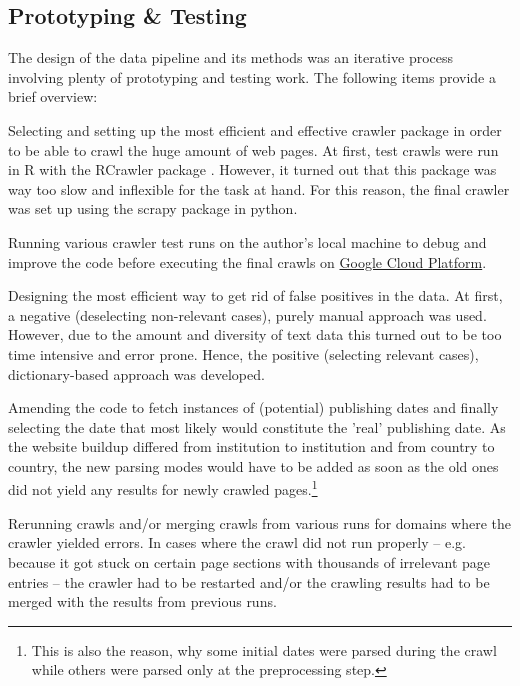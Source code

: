 \subsection{Prototyping \& Testing}\label{Prototyping and Testing}
The design of the data pipeline and its methods was an iterative process involving plenty of prototyping and testing work. The following items provide a brief overview:
\begin{compactitem}
\item Selecting and setting up the most efficient and effective crawler package in order to be able to crawl the huge amount of web pages. At first, test crawls were run in R with the RCrawler package \parencite{Khalil2017}. However, it turned out that this package was way too slow and inflexible for the task at hand. For this reason, the final crawler was set up using the scrapy package \cite{Scrapy2018} in python. 
\item Running various crawler test runs on the author's local machine to debug and improve the code before executing the final crawls on \href{https://cloud.google.com/}{Google Cloud Platform}.
\item Designing the most efficient way to get rid of false positives in the data. At first, a negative (deselecting non-relevant cases), purely manual approach was used. However, due to the amount and diversity of text data this turned out to be too time intensive and error prone. Hence, the positive (selecting relevant cases), dictionary-based approach was developed.
\item Amending the code to fetch instances of (potential) publishing dates and finally selecting the date that most likely would constitute the 'real' publishing date. As the website buildup differed from institution to institution and from country to country, the new parsing modes would have to be added as soon as the old ones did not yield any results for newly crawled pages.\footnote{This is also the reason, why some initial dates were parsed during the crawl while others were parsed only at the preprocessing step.}
\item Rerunning crawls and/or merging crawls from various runs for domains where the crawler yielded errors. In cases where the crawl did not run properly – e.g. because it got stuck on certain page sections with thousands of irrelevant page entries – the crawler had to be restarted and/or the crawling results had to be merged with the results from previous runs. 
\end{compactitem}


